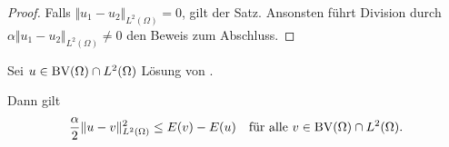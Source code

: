 \begin{proof}
  Falls $\Vert u_1 - u_2 \Vert_{L^2(\Omega)} = 0$, gilt der Satz.
  Ansonsten führt Division durch\\
  $\alpha\Vert u_1 - u_2 \Vert_{L^2(\Omega)}\neq 0$ den 
  Beweis zum Abschluss.
\end{proof}

\begin{theorem}
  \label{thm:convexity}
  Sei $u\in\textup{BV}(\Omega)\cap L^2(\Omega)$ Lösung von 
  .

  Dann gilt 
  \begin{align*}
    \frac{\alpha}{2}\Vert u-v\Vert_{L^2(\Omega)}^2 \leq E(v)-E(u)\quad
    \text{für alle } v\in\textup{BV}(\Omega)\cap L^2(\Omega).
  \end{align*}
\end{theorem}

